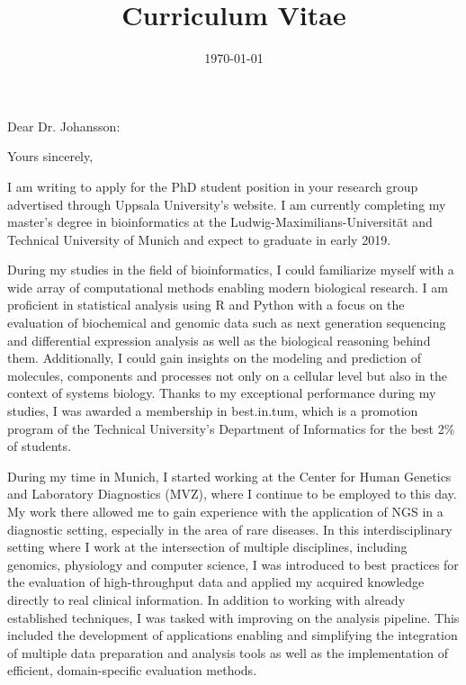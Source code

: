 \documentclass[11pt,a4paper,sans]{moderncv} %
\title{Curriculum Vitae}
\newcommand{\showletter}{}
\begin{document}
	
	
	\ifdefined\showletter
	\clearpage
	\vspace*{-2cm}
	\date{\today} %
	\opening{Dear Dr. Johansson:} %
	\closing{Yours sincerely,} %
	
	\makelettertitle %
	\justify
	\thispagestyle{empty}
	\enlargethispage{45pt}
	\vspace{-20pt}
	I am writing to apply for the PhD student position in your research group advertised through Uppsala University's website.
	I am currently completing my master's degree in bioinformatics at the Ludwig-Maximilians-Universität and Technical University of Munich and expect to graduate in early 2019.
	
	During my studies in the field of bioinformatics, I could familiarize myself with a wide array of computational methods enabling modern biological research.
	I am proficient in statistical analysis using R and Python with a focus on the evaluation of biochemical and genomic data such as next generation sequencing and differential expression analysis as well as the biological reasoning behind them.
	Additionally, I could gain insights on the modeling and prediction of molecules, components and processes not only on a cellular level but also in the context of systems biology.
	Thanks to my exceptional performance during my studies, I was awarded a membership in best.in.tum, which is a promotion program of the Technical University's Department of Informatics for the best 2\% of students.
	
	During my time in Munich, I started working at the Center for Human Genetics and Laboratory Diagnostics (MVZ), where I continue to be employed to this day.
	My work there allowed me to gain experience with the application of NGS in a diagnostic setting, especially in the area of rare diseases.
	In this interdisciplinary setting where I work at the intersection of multiple disciplines, including genomics, physiology and computer science, I was introduced to best practices for the evaluation of high-throughput data and applied my acquired knowledge directly to real clinical information.
	In addition to working with already established techniques, I was tasked with improving on the analysis pipeline.
	This included the development of applications enabling and simplifying the integration of multiple data preparation and analysis tools as well as the implementation of efficient, domain-specific evaluation methods.
	
\end{document}
